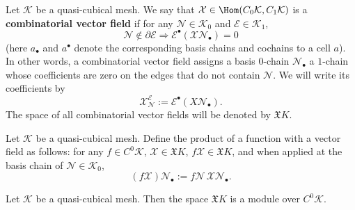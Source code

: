 \begin{definition}
  Let $\mathcal{K}$ be a quasi-cubical mesh.
  We say that $\mathcal{X} \in \Hom(C_0 \mathcal{K}, C_1 \mathcal{K})$
  is a \textbf{combinatorial vector field} if for any
  $\mathcal{N} \in \mathcal{K}_0$ and $\mathcal{E} \in \mathcal{K}_1$,
  \begin{equation}
    \mathcal{N} \notin \partial \mathcal{E} \Rightarrow
    \mathcal{E}^\bullet(\mathcal{X} \mathcal{N}_\bullet) = 0
  \end{equation}
  (here $a_\bullet$ and $a^\bullet$ denote the corresponding basis chains and
  cochains to a cell $a$).
  In other words, a combinatorial vector field assigns a basis $0$-chain
  $\mathcal{N}_\bullet$ a $1$-chain whose coefficients are zero on the edges
  that do not contain $\mathcal{N}$.
  We will write its coefficients by
  \begin{equation}
    \mathcal{X}^{\mathcal{E}}_{\mathcal{N}}
    := \mathcal{E}^\bullet(X \mathcal{N}_\bullet).
  \end{equation}
  The space of all combinatorial vector fields will be denoted by
  $\mathfrak{X} K$.
\end{definition}
\begin{definition}
  Let $\mathcal{K}$ be a quasi-cubical mesh.
  Define the product of a function with a vector field as follows:
  for any $f \in C^0 \mathcal{K}$, $\mathcal{X} \in \mathfrak{X} K$,
  $f \mathcal{X} \in \mathfrak{X} K$, and when applied at
  the basis chain of $\mathcal{N} \in \mathcal{K}_0$,
  \begin{equation}
    (f \mathcal{X}) \mathcal{N}_\bullet
    := f \mathcal{N}\, \mathcal{X} \mathcal{N}_\bullet.
  \end{equation}
\end{definition}
\begin{proposition}
  Let $\mathcal{K}$ be a quasi-cubical mesh.
  Then the space $\mathfrak{X} K$ is a module over $C^0 \mathcal{K}$.
\end{proposition}
